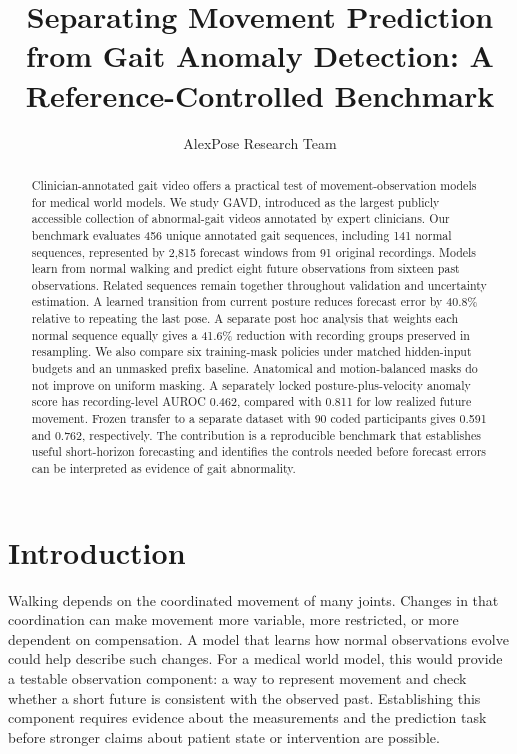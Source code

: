 \documentclass[letterpaper]{article}
\title{Separating Movement Prediction from Gait Anomaly Detection: A Reference-Controlled Benchmark}
\author{AlexPose Research Team}
\begin{document}
\maketitle

\begin{abstract}

Clinician-annotated gait video offers a practical test of movement-observation models for medical world models. We study GAVD, introduced as the largest publicly accessible collection of abnormal-gait videos annotated by expert clinicians. Our benchmark evaluates 456 unique annotated gait sequences, including 141 normal sequences, represented by 2,815 forecast windows from 91 original recordings. Models learn from normal walking and predict eight future observations from sixteen past observations. Related sequences remain together throughout validation and uncertainty estimation. A learned transition from current posture reduces forecast error by 40.8\% relative to repeating the last pose. A separate post hoc analysis that weights each normal sequence equally gives a 41.6\% reduction with recording groups preserved in resampling. We also compare six training-mask policies under matched hidden-input budgets and an unmasked prefix baseline. Anatomical and motion-balanced masks do not improve on uniform masking. A separately locked posture-plus-velocity anomaly score has recording-level AUROC 0.462, compared with 0.811 for low realized future movement. Frozen transfer to a separate dataset with 90 coded participants gives 0.591 and 0.762, respectively. The contribution is a reproducible benchmark that establishes useful short-horizon forecasting and identifies the controls needed before forecast errors can be interpreted as evidence of gait abnormality.

\end{abstract}

\section{Introduction}

Walking depends on the coordinated movement of many joints. Changes in that coordination can make movement more variable, more restricted, or more dependent on compensation. A model that learns how normal observations evolve could help describe such changes. For a medical world model, this would provide a testable observation component: a way to represent movement and check whether a short future is consistent with the observed past. Establishing this component requires evidence about the measurements and the prediction task before stronger claims about patient state or intervention are possible.
\end{document}
